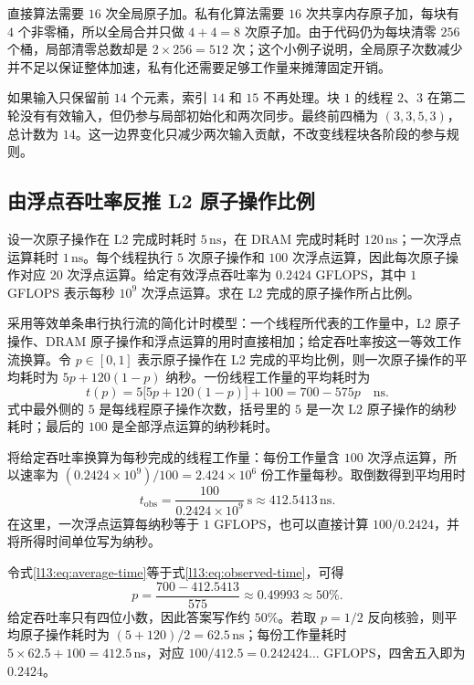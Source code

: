直接算法需要 $16$ 次全局原子加。私有化算法需要 $16$ 次共享内存原子加，每块有 $4$ 个非零桶，所以全局合并只做 $4+4=8$ 次原子加。由于代码仍为每块清零 $256$ 个桶，局部清零总数却是 $2\times256=512$ 次；这个小例子说明，全局原子次数减少并不足以保证整体加速，私有化还需要足够工作量来摊薄固定开销。

如果输入只保留前 $14$ 个元素，索引 $14$ 和 $15$ 不再处理。块 $1$ 的线程 $2$、$3$ 在第二轮没有有效输入，但仍参与局部初始化和两次同步。最终前四桶为 $(3,3,5,3)$，总计数为 $14$。这一边界变化只减少两次输入贡献，不改变线程块各阶段的参与规则。

\subsection{由浮点吞吐率反推 L2 原子操作比例}

设一次原子操作在 L2 完成时耗时 $5\,\mathrm{ns}$，在 DRAM 完成时耗时 $120\,\mathrm{ns}$；一次浮点运算耗时 $1\,\mathrm{ns}$。每个线程执行 $5$ 次原子操作和 $100$ 次浮点运算，因此每次原子操作对应 $20$ 次浮点运算。给定有效浮点吞吐率为 $0.2424$ GFLOPS，其中 $1$ GFLOPS 表示每秒 $10^9$ 次浮点运算。求在 L2 完成的原子操作所占比例。

采用等效单条串行执行流的简化计时模型：一个线程所代表的工作量中，L2 原子操作、DRAM 原子操作和浮点运算的用时直接相加；给定吞吐率按这一等效工作流换算。令 $p\in[0,1]$ 表示原子操作在 L2 完成的平均比例，则一次原子操作的平均耗时为 $5p+120(1-p)$ 纳秒。一份线程工作量的平均耗时为
\begin{equation}
t(p)=5\bigl[5p+120(1-p)\bigr]+100
=700-575p\quad\mathrm{ns}.
\label{l13:eq:average-time}
\end{equation}
式中最外侧的 $5$ 是每线程原子操作次数，括号里的 $5$ 是一次 L2 原子操作的纳秒耗时；最后的 $100$ 是全部浮点运算的纳秒耗时。

将给定吞吐率换算为每秒完成的线程工作量：每份工作量含 $100$ 次浮点运算，所以速率为 $(0.2424\times10^9)/100=2.424\times10^6$ 份工作量每秒。取倒数得到平均用时
\begin{equation}
t_{\mathrm{obs}}
=\frac{100}{0.2424\times10^9}\ \mathrm{s}
\approx412.5413\,\mathrm{ns}.
\label{l13:eq:observed-time}
\end{equation}
在这里，一次浮点运算每纳秒等于 $1$ GFLOPS，也可以直接计算 $100/0.2424$，并将所得时间单位写为纳秒。

令式\eqref{l13:eq:average-time}等于式\eqref{l13:eq:observed-time}，可得
\begin{equation}
p=\frac{700-412.5413}{575}
\approx0.49993
\approx50\%.
\label{l13:eq:l2-ratio}
\end{equation}
给定吞吐率只有四位小数，因此答案写作约 $50\%$。若取 $p=1/2$ 反向核验，则平均原子操作耗时为 $(5+120)/2=62.5\,\mathrm{ns}$；每份工作量耗时 $5\times62.5+100=412.5\,\mathrm{ns}$，对应 $100/412.5=0.242424\ldots$ GFLOPS，四舍五入即为 $0.2424$。

